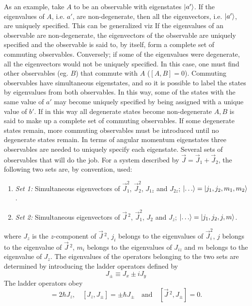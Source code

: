 As an example, take $A$ to be an observable with eigenstates $\ket{a'}$. If the eigenvalues of $A$, i.e. $a'$, are non-degenerate, then all the eigenvectors, i.e. $\ket{a'}$, are uniquely specified. This can be generalized viz If the eigenvalues of an observable are non-degenerate, the eigenvectors of the observable are uniquely specified and the observable is said to, by itself, form a complete set of commuting observables. Conversely; if some of the eigenvalues were degenerate, all the eigenvectors would not be uniquely specified. In this case, one must find other observables (eg. $B$) that commute with $A$ ($[A,B]=0$). Commuting observables have simultaneous eigenstates, and so it is possible to label the states by eigenvalues from both observables. In this way, some of the states with the same value of $a'$ may become uniquely specified by being assigned with a unique value of $b'$. If in this way all degenerate states become non-degenerate $A,B$ is said to make up a complete set of commuting observables. If some degenerate states remain, more commuting observables must be introduced until no degenerate states remain.
In terms of angular momentum eigenstates three observables are needed to uniquely specify each eigenstate. Several sets of observables that will do the job. For a system described by $\vec{J}=\vec{J}_1+\vec{J}_2$, the following two sets are, by convention, used:
\begin{enumerate}
	\item \emph{Set 1:} Simultaneous eigenvectors of $\vec{J}_1^2$, $\vec{J}_2^2$, $J_{1z}$ and $J_{2z}$; $\ket{\dots}=\ket{j_1,j_2,m_1,m_2}$.
	
	\item \emph{Set 2:} Simultaneous eigenvectors of $\vec{J}\,^2$, $\vec{J}_1^2$, $J_{2}$ and $J_{z}$;  $\ket{\dots}=\ket{j_1,j_2,j,m}$.
\end{enumerate}
where $J_z$ is the $z$-component of $\vec{J}\,^2$, $j_i$ belongs to the eigenvalues of $\vec{J}_i^2$, $j$ belongs to the eigenvalue of $\vec{J}\,^2$, $m_i$ belongs to the eigenvalues of $J_{iz}$ and $m$ belongs to the eigenvalue of $J_z$. The eigenvalues of the operators belonging to the two sets are determined by introducing the ladder operators defined by
\begin{equation}
	J_{\pm}\equiv J_x\pm iJ_y
\end{equation} 
The ladder operators obey
\begin{equation}
	[J_+,J_-]=2\hbar J_z, \quad [J_z,J_\pm]=\pm \hbar J_{\pm} \quad \text{and} \quad [\vec{J}\,^2,J_\pm]=0.
\end{equation} 

